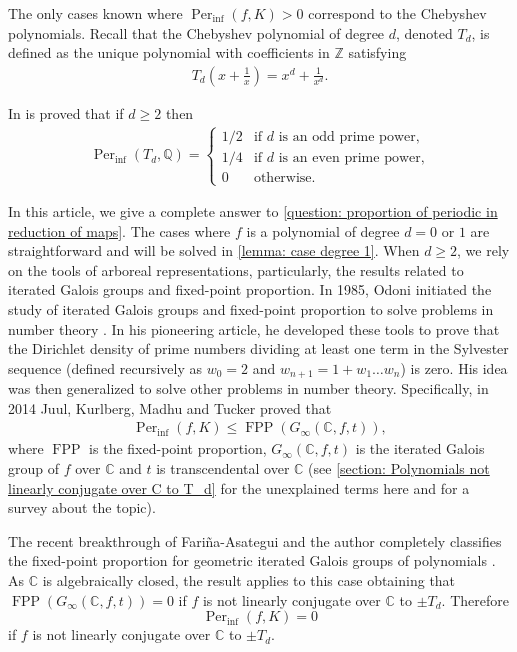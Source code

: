 \documentclass{amsart}
\def\ZZ{\mathbb Z}
\def\QQ{\mathbb Q}
\def\CC{\mathbb C}
\DeclareMathOperator{\FPP}{FPP}
\DeclareMathOperator{\Per}{Per}
\theoremstyle{definition}
\begin{document}
The only cases known where $\Per_{\inf}(f,K) > 0$ correspond to the Chebyshev polynomials. Recall that the Chebyshev polynomial of degree $d$, denoted $T_d$, is defined as the unique polynomial with coefficients in $\ZZ$ satisfying
\begin{align}
T_d \left( x + \frac{1}{x} \right) = x^d + \frac{1}{x^d}.
\label{equation: definition Chebyshev polynomial}
\end{align}

In \cite[Example 7.2]{Juul2014} is proved that if $d \geq 2$ then
\begin{align}
\Per_{\inf}(T_d,\QQ) = \left \{ \begin{matrix} 
1/2 & \mbox{if $d$ is an odd prime power,} \\ 
1/4 & \mbox{if $d$ is an even prime power,} \\
0 & \mbox{otherwise.}
\end{matrix}\right.
\label{equation: Per in chebyshev over Q}
\end{align} 

In this article, we give a complete answer to \cref{question: proportion of periodic in reduction of maps}. The cases where $f$ is a polynomial of degree $d = 0$ or $1$ are straightforward and will be solved in \cref{lemma: case degree 1}. 
When $d \geq 2$, we rely on the tools of arboreal representations, particularly, the results related to iterated Galois groups and fixed-point proportion. In 1985, Odoni initiated the study of iterated Galois groups and fixed-point proportion to solve problems in number theory \cite{Odoni1980}. In his pioneering article, he developed these tools to prove that the Dirichlet density of prime numbers dividing at least one term in the Sylvester sequence (defined recursively as $w_0 = 2$ and $w_{n+1} = 1 + w_1 \dots w_n$) is zero. His idea was then generalized to solve other problems in number theory. Specifically, in 2014 Juul, Kurlberg, Madhu and Tucker proved that 
\begin{align}
\Per_{\inf}(f,K) \leq \FPP(G_\infty(\CC,f,t)),
\label{equation: upper bound PerInf FPP intro}
\end{align}
where $\FPP$ is the fixed-point proportion, $G_\infty(\CC,f,t)$ is the iterated Galois group of $f$ over $\CC$ and $t$ is transcendental over $\CC$ (see \cref{section: Polynomials not linearly conjugate over C to T_d} for the unexplained terms here and \cite{Jones2014} for a survey about the topic). 

The recent breakthrough of Fariña-Asategui and the author  completely classifies the fixed-point proportion for geometric iterated Galois groups of polynomials \cite[Theorem 2]{FariñaRadi2026FPP}. As $\CC$ is algebraically closed, the result applies to this case obtaining that 
$\FPP(G_\infty(\CC,f,t)) = 0$ if $f$ is not linearly conjugate over $\CC$ to $\pm T_d$. Therefore $$\Per_{\inf}(f,K) = 0$$ if $f$ is not linearly conjugate over $\CC$ to $\pm T_d$. 
\end{document}
